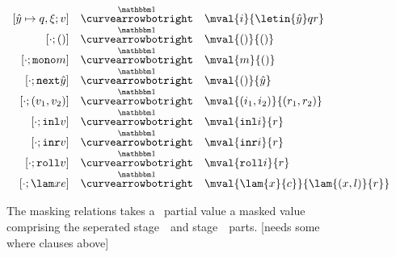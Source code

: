 \begin{figure}
\begin{abstrsyn}
\[\begin{array}{rll}
[\hat y \mapsto q,\xi;v]
  &\vsplito& \mval 
  {i}
  {\letin {\hat y} q {r}} \\\relax
[\cdot;()]
  &\vsplito& \mval 
  {()}
  {()} \\\relax
[\cdot;\monoTerm{m}]
  &\vsplito& \mval 
  {m}
  {()} \\\relax
[\cdot;\next{\hat y}]
  &\vsplito& \mval 
  {()}
  {\hat y} \\\relax
[\cdot;(v_1,v_2)]
  &\vsplito& \mval 
  {(i_1,i_2)}
  {(r_1,r_2)} \\\relax
[\cdot;\inl{v}]
  &\vsplito& \mval 
  {\inl{i}}
  {r} \\\relax
[\cdot;\inr{v}]
  &\vsplito& \mval 
  {\inr{i}}
  {r} \\\relax
[\cdot;\roll{v}]
  &\vsplito& \mval 
  {\roll{i}}
  {r} \\\relax
[\cdot;\lam xe]
  &\vsplito& \mval 
  {\lam {x} {c}}
  {\lam {(x,l)} {r}}
\end{array}\]
\end{abstrsyn}
\caption{The masking relations takes a \lang\ partial value a masked value
comprising the seperated stage~\bbone\ and stage~\bbtwo\ parts. 
[needs some where clauses above]}
\label{fig:valMask}
\end{figure}

%

